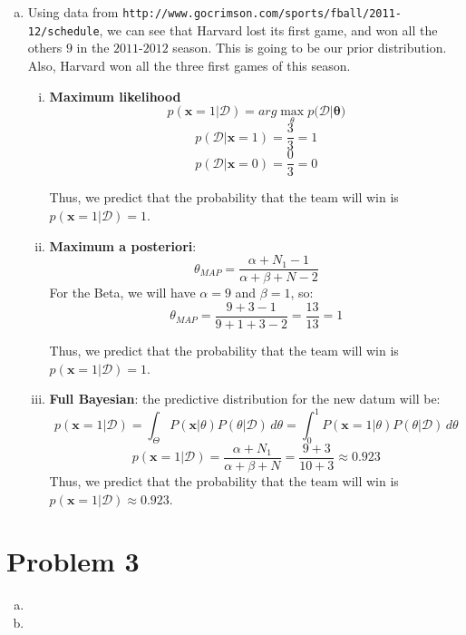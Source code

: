 \documentclass{article}
\begin{document}
\begin{enumerate}[a.]
\item %
Using data from \texttt{http://www.gocrimson.com/sports/fball/2011-12/schedule}, we can see that Harvard lost its first game, and won all the others $9$ in the $2011$-$2012$ season. This is going to be our prior distribution. Also, Harvard won all the three first games of this season.

\begin{enumerate}[i.]
\item
\textbf{Maximum likelihood}
$$p(\bm{x} = 1|\mathcal D)=arg\max_\theta{p(\mathcal D|\bm{\theta}})$$
$$p(\mathcal D|\bm{x}=1)=\frac{3}{3}=1$$
$$p(\mathcal D|\bm{x}=0)=\frac{0}{3}=0$$

Thus, we predict that the probability that the team will win is $p(\bm{x}=1|\mathcal D)= 1$.

\item
\textbf{Maximum a posteriori}:
$$\theta_{MAP}=\frac{\alpha+N_1-1}{\alpha+\beta+N-2}$$
For the Beta, we will have $\alpha=9$ and $\beta=1$, so:
$$\theta_{MAP}=\frac{9+3-1}{9+1+3-2}=\frac{13}{13}=1$$

Thus, we predict that the probability that the team will win is $p(\bm{x}=1|\mathcal D)=1$.
\item
\textbf{Full Bayesian}: the predictive distribution for the new datum will be:
$$p(\bm{x}=1|\mathcal D)= \int_\Theta P(\bm{x}|\theta)P(\theta | \mathcal{D})\,d\theta=\int_0^1 P(\bm{x}=1|\theta)P(\theta | \mathcal{D})\,d\theta$$
$$p(\bm{x}=1|\mathcal D)= \frac{\alpha+N_1}{\alpha+\beta+N}=\frac{9+3}{10+3}\approx 0.923$$
Thus, we predict that the probability that the team will win is $p(\bm{x}=1|\mathcal D)\approx 0.923$.

\end{enumerate}

\end{enumerate}

\section*{Problem 3}

\begin{enumerate}[a.]

\item %


\item %


\end{enumerate}
\newpage
\end{document}
